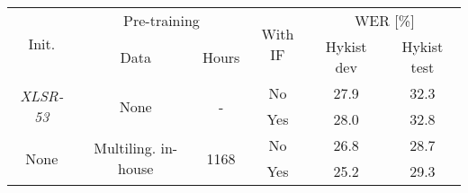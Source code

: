 

\begin{table}[!ht]
\captionsetup{font=Large}
\centering
\begin{adjustbox}{width=0.7\columnwidth,center}
\begin{tabular}{|c|c|c|c|c|c|} 
\hline
\multirow{2}{*}{Init.}            & \multicolumn{2}{c|}{Pre-training}                            & \multirow{2}{*}{With IF} & \multicolumn{2}{c|}{WER [\%]}  \\ 
\cline{2-3}\cline{5-6}
                                  & Data                                 & Hours                 &                          & Hykist dev & Hykist test       \\ 
\hline
\multirow{2}{*}{\textit{XLSR-53}} & \multirow{2}{*}{None}                & \multirow{2}{*}{-}    & No                       & 27.9       & 32.3              \\ 
\cline{4-6}
                                  &                                      &                       & Yes                      & 28.0       & 32.8              \\ 
\hline
\multirow{2}{*}{None}             & \multirow{2}{*}{Multiling. in-house} & \multirow{2}{*}{1168} & No                       & 26.8       & 28.7              \\ 
\cline{4-6}
                                  &                                      &                       & Yes                      & 25.2       & 29.3              \\
\hline
\end{tabular}
\end{adjustbox}
\caption{
    }
\label{table:if_loss_hykist_neg}
\end{table}